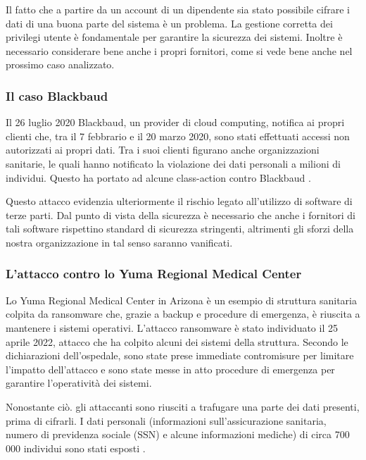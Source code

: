 \documentclass[12pt]{article}
\begin{document}
Il fatto che a partire da un account di un dipendente sia stato possibile cifrare i dati di una buona parte del sistema è un problema. La gestione corretta dei privilegi utente è fondamentale per garantire la sicurezza dei sistemi. Inoltre è necessario considerare bene anche i propri fornitori, come si vede bene anche nel prossimo caso analizzato.

\subsubsection{Il caso Blackbaud}

Il 26 luglio 2020 Blackbaud, un provider di cloud computing, notifica ai propri clienti che, tra il 7 febbrario e il 20 marzo 2020, sono stati effettuati accessi non autorizzati ai propri dati. Tra i suoi clienti figurano anche organizzazioni sanitarie, le quali hanno notificato la violazione dei dati personali a milioni di individui. Questo ha portato ad alcune class-action contro Blackbaud \cite{noauthor_recent_2022} \cite{noauthor_blackbaud_2020} \cite{healthitsecurity_blackbaud_2020}.

Questo attacco evidenzia ulteriormente il rischio legato all'utilizzo di software di terze parti. Dal punto di vista della sicurezza è necessario che anche i fornitori di tali software rispettino standard di sicurezza stringenti, altrimenti gli sforzi della nostra organizzazione in tal senso saranno vanificati.

\subsubsection{L'attacco contro lo Yuma Regional Medical Center}

Lo Yuma Regional Medical Center in Arizona è un esempio di struttura sanitaria colpita da ransomware che, grazie a backup e procedure di emergenza, è riuscita a mantenere i sistemi operativi. L'attacco ransomware è stato individuato il 25 aprile 2022, attacco che ha colpito alcuni dei sistemi della struttura. Secondo le dichiarazioni dell'ospedale, sono state prese immediate contromisure per limitare l'impatto dell'attacco e sono state messe in atto procedure di emergenza per garantire l'operatività dei sistemi.

Nonostante ciò. gli attaccanti sono riusciti a trafugare una parte dei dati presenti, prima di cifrarli. I dati personali (informazioni sull'assicurazione sanitaria, numero di previdenza sociale (SSN) e alcune informazioni mediche) di circa 700 000 individui sono stati esposti \cite{journal_700000_2022} \cite{noauthor_healthcare_2022}.
\end{document}
